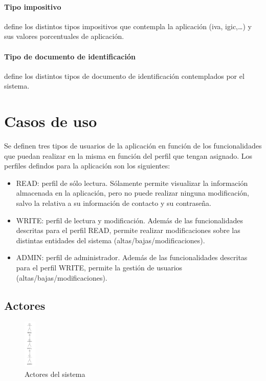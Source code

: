 \paragraph{Tipo impositivo} define los distintos tipos impositivos que contempla la aplicación (iva, igic,\dots) y sus valores porcentuales de aplicación.
\paragraph{Tipo de documento de identificación} define los distintos tipos de documento de identificación contemplados por el sistema.



\section{Casos de uso}
\label{sec:casos de uso}

Se definen tres tipos de usuarios de la aplicación en función de los funcionalidades que puedan realizar en la misma en función del perfil que tengan asignado. Los perfiles defindos para la aplicación son los siguientes:

\begin{itemize}
\item READ: perfil de sólo lectura. Sólamente permite visualizar la información almacenada en la aplicación, pero no puede realizar ninguna modificación, salvo la relativa a su información de contacto y su contraseña.
\item WRITE: perfil de lectura y modificación. Además de las funcionalidades descritas para el perfil READ, permite realizar modificaciones sobre las distintas entidades del sistema (altas/bajas/modificaciones).
\item ADMIN: perfil de administrador. Además de las funcionalidades descritas para el perfil WRITE, permite la gestión de usuarios (altas/bajas/modificaciones).
\end{itemize}


\subsection{Actores}
\label{sub:actores_analisis}


\begin{figure}[hp!]
  \centering
  \includegraphics[width=0.05\textwidth]{imaxes/actores.png}
  \caption{Actores del sistema}
  \label{fig:actores}
\end{figure}

